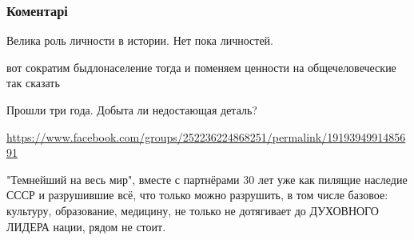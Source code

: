  
 
 
 
 
\subsubsection{Коментарі}

\begin{itemize}
 
Велика роль личности в истории. Нет пока личностей.

 
вот сократим быдлонаселение тогда и поменяем ценности на общечеловеческие так сказать

 
Прошли три года. Добыта ли недостающая деталь?

\url{https://www.facebook.com/groups/252236224868251/permalink/1919394991485691}

 

"Темнейший на весь мир", вместе с партнёрами 30 лет уже как пилящие наследие
СССР и разрушившие всё, что только можно разрушить, в том числе базовое:
культуру, образование, медицину, не только не дотягивает до ДУХОВНОГО ЛИДЕРА
нации, рядом не стоит.


\end{itemize}
